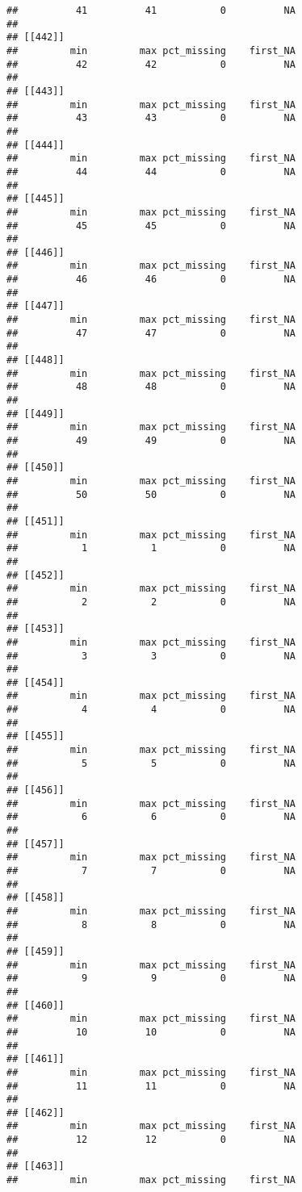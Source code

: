 \documentclass[
]{article}
\begin{document}
\begin{verbatim}
##          41          41           0          NA 
## 
## [[442]]
##         min         max pct_missing    first_NA 
##          42          42           0          NA 
## 
## [[443]]
##         min         max pct_missing    first_NA 
##          43          43           0          NA 
## 
## [[444]]
##         min         max pct_missing    first_NA 
##          44          44           0          NA 
## 
## [[445]]
##         min         max pct_missing    first_NA 
##          45          45           0          NA 
## 
## [[446]]
##         min         max pct_missing    first_NA 
##          46          46           0          NA 
## 
## [[447]]
##         min         max pct_missing    first_NA 
##          47          47           0          NA 
## 
## [[448]]
##         min         max pct_missing    first_NA 
##          48          48           0          NA 
## 
## [[449]]
##         min         max pct_missing    first_NA 
##          49          49           0          NA 
## 
## [[450]]
##         min         max pct_missing    first_NA 
##          50          50           0          NA 
## 
## [[451]]
##         min         max pct_missing    first_NA 
##           1           1           0          NA 
## 
## [[452]]
##         min         max pct_missing    first_NA 
##           2           2           0          NA 
## 
## [[453]]
##         min         max pct_missing    first_NA 
##           3           3           0          NA 
## 
## [[454]]
##         min         max pct_missing    first_NA 
##           4           4           0          NA 
## 
## [[455]]
##         min         max pct_missing    first_NA 
##           5           5           0          NA 
## 
## [[456]]
##         min         max pct_missing    first_NA 
##           6           6           0          NA 
## 
## [[457]]
##         min         max pct_missing    first_NA 
##           7           7           0          NA 
## 
## [[458]]
##         min         max pct_missing    first_NA 
##           8           8           0          NA 
## 
## [[459]]
##         min         max pct_missing    first_NA 
##           9           9           0          NA 
## 
## [[460]]
##         min         max pct_missing    first_NA 
##          10          10           0          NA 
## 
## [[461]]
##         min         max pct_missing    first_NA 
##          11          11           0          NA 
## 
## [[462]]
##         min         max pct_missing    first_NA 
##          12          12           0          NA 
## 
## [[463]]
##         min         max pct_missing    first_NA 

\end{verbatim}
\end{document}
